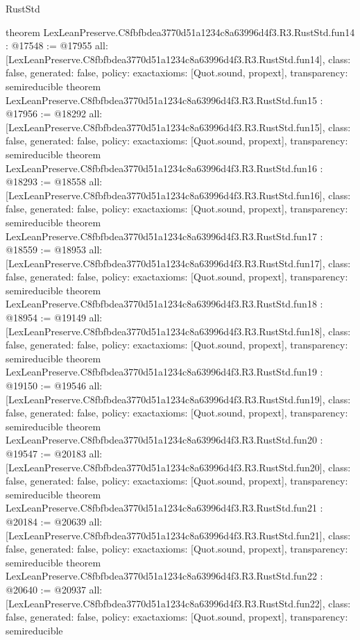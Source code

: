 \begin{lexlean}{RustStd}
\begin{coremodule}
{}
theorem LexLeanPreserve.C8fbfbdea3770d51a1234c8a63996d4f3.R3.RustStd.fun14 : @17548 := @17955 {
  all: [LexLeanPreserve.C8fbfbdea3770d51a1234c8a63996d4f3.R3.RustStd.fun14],
  class: false,
  generated: false,
  policy: exact{axioms: [Quot.sound, propext]},
  transparency: semireducible
}
theorem LexLeanPreserve.C8fbfbdea3770d51a1234c8a63996d4f3.R3.RustStd.fun15 : @17956 := @18292 {
  all: [LexLeanPreserve.C8fbfbdea3770d51a1234c8a63996d4f3.R3.RustStd.fun15],
  class: false,
  generated: false,
  policy: exact{axioms: [Quot.sound, propext]},
  transparency: semireducible
}
theorem LexLeanPreserve.C8fbfbdea3770d51a1234c8a63996d4f3.R3.RustStd.fun16 : @18293 := @18558 {
  all: [LexLeanPreserve.C8fbfbdea3770d51a1234c8a63996d4f3.R3.RustStd.fun16],
  class: false,
  generated: false,
  policy: exact{axioms: [Quot.sound, propext]},
  transparency: semireducible
}
theorem LexLeanPreserve.C8fbfbdea3770d51a1234c8a63996d4f3.R3.RustStd.fun17 : @18559 := @18953 {
  all: [LexLeanPreserve.C8fbfbdea3770d51a1234c8a63996d4f3.R3.RustStd.fun17],
  class: false,
  generated: false,
  policy: exact{axioms: [Quot.sound, propext]},
  transparency: semireducible
}
theorem LexLeanPreserve.C8fbfbdea3770d51a1234c8a63996d4f3.R3.RustStd.fun18 : @18954 := @19149 {
  all: [LexLeanPreserve.C8fbfbdea3770d51a1234c8a63996d4f3.R3.RustStd.fun18],
  class: false,
  generated: false,
  policy: exact{axioms: [Quot.sound, propext]},
  transparency: semireducible
}
theorem LexLeanPreserve.C8fbfbdea3770d51a1234c8a63996d4f3.R3.RustStd.fun19 : @19150 := @19546 {
  all: [LexLeanPreserve.C8fbfbdea3770d51a1234c8a63996d4f3.R3.RustStd.fun19],
  class: false,
  generated: false,
  policy: exact{axioms: [Quot.sound, propext]},
  transparency: semireducible
}
theorem LexLeanPreserve.C8fbfbdea3770d51a1234c8a63996d4f3.R3.RustStd.fun20 : @19547 := @20183 {
  all: [LexLeanPreserve.C8fbfbdea3770d51a1234c8a63996d4f3.R3.RustStd.fun20],
  class: false,
  generated: false,
  policy: exact{axioms: [Quot.sound, propext]},
  transparency: semireducible
}
theorem LexLeanPreserve.C8fbfbdea3770d51a1234c8a63996d4f3.R3.RustStd.fun21 : @20184 := @20639 {
  all: [LexLeanPreserve.C8fbfbdea3770d51a1234c8a63996d4f3.R3.RustStd.fun21],
  class: false,
  generated: false,
  policy: exact{axioms: [Quot.sound, propext]},
  transparency: semireducible
}
theorem LexLeanPreserve.C8fbfbdea3770d51a1234c8a63996d4f3.R3.RustStd.fun22 : @20640 := @20937 {
  all: [LexLeanPreserve.C8fbfbdea3770d51a1234c8a63996d4f3.R3.RustStd.fun22],
  class: false,
  generated: false,
  policy: exact{axioms: [Quot.sound, propext]},
  transparency: semireducible
}
\end{coremodule}
\end{lexlean}
